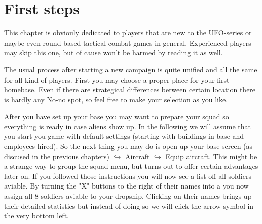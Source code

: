 

%
%

\section{First steps}
This chapter is obviouly dedicated to players that are new to the UFO-series or maybe even round based tactical combat games in general. Experienced players may skip this one, but of cause won't be harmed by reading it as well.

The usual process after starting a new campaign is quite unified and all the same for all kind of players. First you may choose a proper place for your first homebase. Even if there are strategical differences between certain location there is hardly any No-no spot, so feel free to make your selection as you like.

After you have set up your base you may want to prepare your squad so everything is ready in case aliens show up. In the following we will assume that you start you game with default settings (starting with buildings in base and employees hired). So the next thing you may do is open up your base-screen (as discused in the previous chapters) $\hookrightarrow$ Aircraft $\hookrightarrow$ Equip aircraft. This might be a strange way to group the squad menu, but turns out to offer certain advantages later on. If you followed those instructions you will now see a list off all soldiers aviable. By turning the "X" buttons to the right of their names into a \surd you now assign all 8 soldiers aviable to your dropship. Clicking on their names brings up their detailed statistics but instead of doing so we will click the arrow symbol in the very bottom left.

